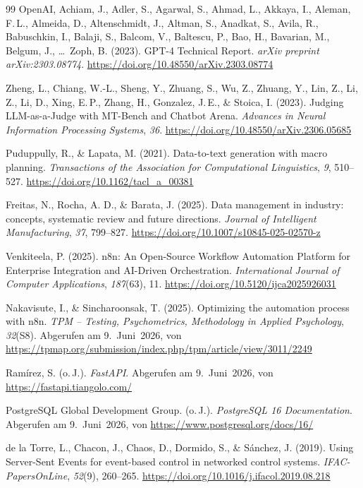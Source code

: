 \begin{thebibliography}{99}
  OpenAI, Achiam, J., Adler, S., Agarwal, S., Ahmad, L., Akkaya, I., Aleman, F.\,L., Almeida, D., Altenschmidt, J., Altman, S., Anadkat, S., Avila, R., Babuschkin, I., Balaji, S., Balcom, V., Baltescu, P., Bao, H., Bavarian, M., Belgum, J., \ldots\ Zoph, B. (2023). GPT-4 Technical Report. \textit{arXiv preprint arXiv:2303.08774}. \url{https://doi.org/10.48550/arXiv.2303.08774}

  Zheng, L., Chiang, W.-L., Sheng, Y., Zhuang, S., Wu, Z., Zhuang, Y., Lin, Z., Li, Z., Li, D., Xing, E.\,P., Zhang, H., Gonzalez, J.\,E., \& Stoica, I. (2023). Judging LLM-as-a-Judge with MT-Bench and Chatbot Arena. \textit{Advances in Neural Information Processing Systems}, \textit{36}. \url{https://doi.org/10.48550/arXiv.2306.05685}

  Puduppully, R., \& Lapata, M. (2021). Data-to-text generation with macro planning. \textit{Transactions of the Association for Computational Linguistics}, \textit{9}, 510--527. \url{https://doi.org/10.1162/tacl_a_00381}

  Freitas, N., Rocha, A. D., \& Barata, J. (2025). Data management in industry: concepts, systematic review and future directions. \textit{Journal of Intelligent Manufacturing}, \textit{37}, 799--827. \url{https://doi.org/10.1007/s10845-025-02570-z}

  Venkiteela, P. (2025). n8n: An Open-Source Workflow Automation Platform for Enterprise Integration and AI-Driven Orchestration. \textit{International Journal of Computer Applications}, \textit{187}(63), 11. \url{https://doi.org/10.5120/ijca2025926031}

  Nakavisute, I., \& Sincharoonsak, T. (2025). Optimizing the automation process with n8n. \textit{TPM -- Testing, Psychometrics, Methodology in Applied Psychology}, \textit{32}(S8). Abgerufen am 9.~Juni~2026, von \url{https://tpmap.org/submission/index.php/tpm/article/view/3011/2249}

  Ramírez, S. (o.\,J.). \textit{FastAPI}. Abgerufen am 9.~Juni~2026, von \url{https://fastapi.tiangolo.com/}

  PostgreSQL Global Development Group. (o.\,J.). \textit{PostgreSQL 16 Documentation}. Abgerufen am 9.~Juni~2026, von \url{https://www.postgresql.org/docs/16/}

  de la Torre, L., Chacon, J., Chaos, D., Dormido, S., \& Sánchez, J. (2019). Using Server-Sent Events for event-based control in networked control systems. \textit{IFAC-PapersOnLine}, \textit{52}(9), 260--265. \url{https://doi.org/10.1016/j.ifacol.2019.08.218}


\end{thebibliography}

